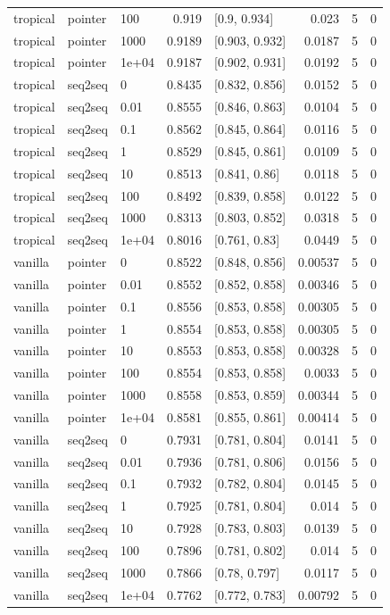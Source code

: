 \documentclass[10pt]{article}
\begin{document}
{\begin{longtable}{lllrlrrr}
tropical & pointer & 100 & 0.919 & [0.9, 0.934] & 0.023 & 5 & 0\\
tropical & pointer & 1000 & 0.9189 & [0.903, 0.932] & 0.0187 & 5 & 0\\
tropical & pointer & 1e+04 & 0.9187 & [0.902, 0.931] & 0.0192 & 5 & 0\\
tropical & seq2seq & 0 & 0.8435 & [0.832, 0.856] & 0.0152 & 5 & 0\\
tropical & seq2seq & 0.01 & 0.8555 & [0.846, 0.863] & 0.0104 & 5 & 0\\
tropical & seq2seq & 0.1 & 0.8562 & [0.845, 0.864] & 0.0116 & 5 & 0\\
tropical & seq2seq & 1 & 0.8529 & [0.845, 0.861] & 0.0109 & 5 & 0\\
tropical & seq2seq & 10 & 0.8513 & [0.841, 0.86] & 0.0118 & 5 & 0\\
tropical & seq2seq & 100 & 0.8492 & [0.839, 0.858] & 0.0122 & 5 & 0\\
tropical & seq2seq & 1000 & 0.8313 & [0.803, 0.852] & 0.0318 & 5 & 0\\
tropical & seq2seq & 1e+04 & 0.8016 & [0.761, 0.83] & 0.0449 & 5 & 0\\
vanilla & pointer & 0 & 0.8522 & [0.848, 0.856] & 0.00537 & 5 & 0\\
vanilla & pointer & 0.01 & 0.8552 & [0.852, 0.858] & 0.00346 & 5 & 0\\
vanilla & pointer & 0.1 & 0.8556 & [0.853, 0.858] & 0.00305 & 5 & 0\\
vanilla & pointer & 1 & 0.8554 & [0.853, 0.858] & 0.00305 & 5 & 0\\
vanilla & pointer & 10 & 0.8553 & [0.853, 0.858] & 0.00328 & 5 & 0\\
vanilla & pointer & 100 & 0.8554 & [0.853, 0.858] & 0.0033 & 5 & 0\\
vanilla & pointer & 1000 & 0.8558 & [0.853, 0.859] & 0.00344 & 5 & 0\\
vanilla & pointer & 1e+04 & 0.8581 & [0.855, 0.861] & 0.00414 & 5 & 0\\
vanilla & seq2seq & 0 & 0.7931 & [0.781, 0.804] & 0.0141 & 5 & 0\\
vanilla & seq2seq & 0.01 & 0.7936 & [0.781, 0.806] & 0.0156 & 5 & 0\\
vanilla & seq2seq & 0.1 & 0.7932 & [0.782, 0.804] & 0.0145 & 5 & 0\\
vanilla & seq2seq & 1 & 0.7925 & [0.781, 0.804] & 0.014 & 5 & 0\\
vanilla & seq2seq & 10 & 0.7928 & [0.783, 0.803] & 0.0139 & 5 & 0\\
vanilla & seq2seq & 100 & 0.7896 & [0.781, 0.802] & 0.014 & 5 & 0\\
vanilla & seq2seq & 1000 & 0.7866 & [0.78, 0.797] & 0.0117 & 5 & 0\\
vanilla & seq2seq & 1e+04 & 0.7762 & [0.772, 0.783] & 0.00792 & 5 & 0\\
\bottomrule
\end{longtable}
}
\end{document}
